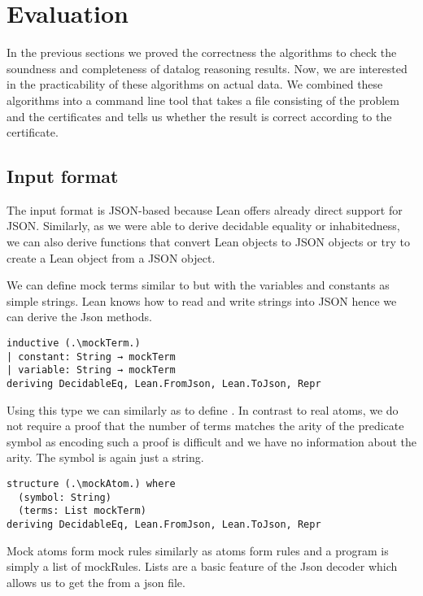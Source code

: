\chapter{Evaluation}\label{sec:eval}

In the previous sections we proved the correctness the algorithms to check the soundness and completeness of datalog reasoning results. Now, we are interested in the practicability of these algorithms on actual data. We combined these algorithms into a command line tool that takes a file consisting of the problem and the certificates and tells us whether the result is correct according to the certificate. 

\section{Input format}

The input format is JSON-based because Lean offers already direct support for JSON. Similarly, as we were able to derive decidable equality or inhabitedness, we can also derive functions that convert Lean objects to JSON objects or try to create a Lean object from a JSON object.

We can define mock terms similar to \term but with the variables and constants as simple strings. Lean knows how to read and write strings into JSON hence we can derive the Json methods.

\begin{lstlisting}
inductive (.\mockTerm.)
| constant: String → mockTerm
| variable: String → mockTerm
deriving DecidableEq, Lean.FromJson, Lean.ToJson, Repr
\end{lstlisting}

Using this type we can similarly as to \atom define \mockAtom. In contrast to real atoms, we do not require a proof that the number of terms matches the arity of the predicate symbol as encoding such a proof is difficult and we have no information about the arity. The symbol is again just a string.

\begin{lstlisting}
structure (.\mockAtom.) where
  (symbol: String)
  (terms: List mockTerm)
deriving DecidableEq, Lean.FromJson, Lean.ToJson, Repr
\end{lstlisting}

Mock atoms form mock rules similarly as atoms form rules and a program is simply a list of mockRules. Lists are a basic feature of the Json decoder which allows us to get the from a json file. 

